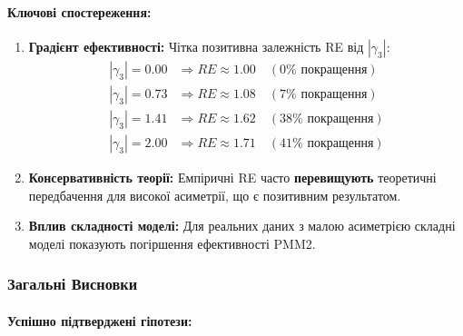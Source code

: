 \paragraph{Ключові спостереження:}

\begin{enumerate}
    \item \textbf{Градієнт ефективності:} Чітка позитивна залежність RE від $|\gamma_3|$:
    \begin{align*}
    |\gamma_3| = 0.00 &\Rightarrow RE \approx 1.00 \quad (0\% \text{ покращення}) \\
    |\gamma_3| = 0.73 &\Rightarrow RE \approx 1.08 \quad (7\% \text{ покращення}) \\
    |\gamma_3| = 1.41 &\Rightarrow RE \approx 1.62 \quad (38\% \text{ покращення}) \\
    |\gamma_3| = 2.00 &\Rightarrow RE \approx 1.71 \quad (41\% \text{ покращення})
    \end{align*}

    \item \textbf{Консервативність теорії:} Емпіричні RE часто \textbf{перевищують} теоретичні передбачення для високої асиметрії, що є позитивним результатом.

    \item \textbf{Вплив складності моделі:} Для реальних даних з малою асиметрією складні моделі показують погіршення ефективності PMM2.
\end{enumerate}

\subsubsection{Загальні Висновки}
\label{subsubsec:overall_conclusions}

\paragraph{Успішно підтверджені гіпотези:}

